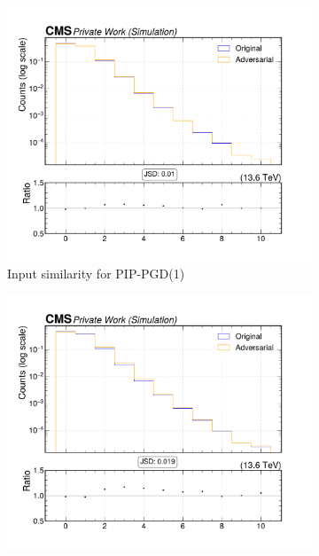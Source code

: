 \begin{figure}[htbp]
  \centering
  \begin{subfigure}[t]{0.32\textwidth}
    \includegraphics[width=\linewidth]{media/output/features/compare/combined_it_1/cmp_global_features_nsv.pdf}
    \caption*{Input similarity for PIP-PGD(1)}
  \end{subfigure}\hfill
  \begin{subfigure}[t]{0.32\textwidth}
    \includegraphics[width=\linewidth]{media/output/features/compare/combined_it_2/cmp_global_features_nsv.pdf}

\end{subfigure}
\end{figure}
